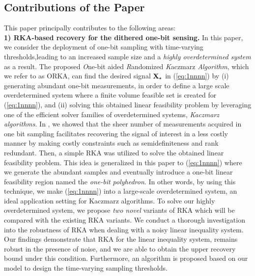 \documentclass[12pt,draftcls,onecolumn]{IEEEtran}
\begin{document}
\subsection{Contributions of the Paper}
This paper principally contributes to the following areas:\\
\textbf{1) RKA-based recovery for the dithered one-bit sensing.} 
In this paper, we consider the deployment of one-bit sampling with time-varying thresholds,leading to an increased sample size and a \emph{highly overdetermined system} as a result. The proposed \emph{O}ne-bit aided \emph{R}andomized \emph{K}aczmarz \emph{Algorithm}, which we refer to as ORKA, can find the desired signal $\mathbf{X}_{\star}$ in (\ref{eq:1nnnn}) by (i) generating abundant one-bit measurements, in order to define a large scale overdetermined system where a finite volume feasible set is created for (\ref{eq:1nnnn}), and (ii) solving this obtained linear feasibility problem by leveraging one of the efficient solver families of overdetermined systems, \emph{Kaczmarz algorithms}.
In \cite{eamaz2022phase}, we showed that the sheer number of measurements acquired in one bit sampling facilitates recovering the signal of interest in a less costly manner by making costly constraints such as semidefiniteness and rank redundant. Then, a simple RKA was utilized to solve the obtained linear feasibility problem. This idea is generalized in this paper to (\ref{eq:1nnnn}) where we generate the abundant samples and eventually introduce a one-bit linear feasibility region named the \emph{one-bit polyhedron}. In other words, by using this technique, we make (\ref{eq:1nnnn}) into a large-scale overdetermined system, an ideal application setting for Kaczmarz algorithms.
To solve our highly overdetermined system, we propose \emph{two novel} variants of RKA which will be compared with the existing RKA variants. We conduct a thorough investigation into the robustness of RKA when dealing with a noisy linear inequality system. Our findings demonstrate that RKA for the linear inequality system, remains robust in the presence of noise, and we are able to obtain the upper recovery bound under this condition. Furthermore, an
algorithm is proposed based on our model to design the time-varying sampling thresholds. %
\\
\end{document}
